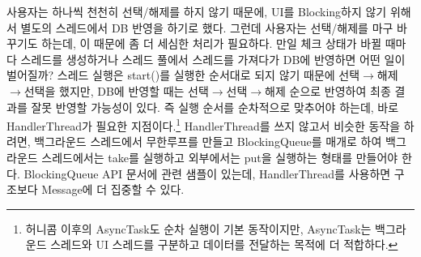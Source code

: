 사용자는 하나씩 천천히 선택/해제를 하지 않기 때문에, UI를 Blocking하지 않기 위해서 별도의 스레드에서 DB 반영을 하기로 했다.
그런데 사용자는 선택/해제를 마구 바꾸기도 하는데, 이 때문에 좀 더 세심한 처리가 필요하다.
만일 체크 상태가 바뀔 때마다 스레드를 생성하거나 스레드 풀에서 스레드를 가져다가 DB에 반영하면 어떤 일이 벌어질까? 스레드 실행은 start()를 실행한 순서대로 되지 않기 때문에 선택$\rightarrow$해제$\rightarrow$선택을 했지만, DB에 반영할 때는 선택$\rightarrow$선택$\rightarrow$해제 순으로 반영하여 최종 결과를 잘못 반영할 가능성이 있다. 
즉 실행 순서를 순차적으로 맞추어야 하는데, 바로 HandlerThread가 필요한 지점이다.\footnote{허니콤 이후의 AsyncTask도 순차 실행이 기본 동작이지만, AsyncTask는 백그라운드 스레드와 UI 스레드를 구분하고 데이터를 전달하는 목적에 더 적합하다.}
HandlerThread를 쓰지 않고서 비슷한 동작을 하려면, 백그라운드 스레드에서 무한루프를 만들고 BlockingQueue를 매개로 하여 백그라운드 스레드에서는 take를 실행하고 외부에서는 put을 실행하는 형태를 만들어야 한다.
BlockingQueue API 문서에 관련 샘플이 있는데, HandlerThread를 사용하면 구조보다 Message에 더 집중할 수 있다.\\

